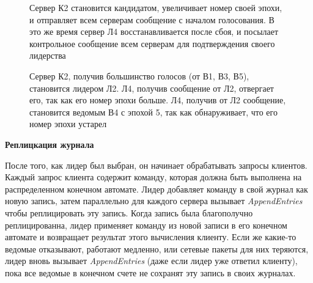 \documentclass[subf, href, colorlinks=true, 14pt,
times, mtpro, specialist]{disser}
\theoremstyle{definition}
\begin{document}
\begin{figure}[H]
\begin{minipage}[h]{0.46\linewidth}
\begin{small}
Сервер К2 становится кандидатом, увеличивает номер своей эпохи, и отправляет всем серверам сообщение с началом голосования. В это же время сервер Л4 восстанавливается после сбоя, и посылает контрольное сообщение всем серверам для подтверждения своего лидерства \\
\end{small}
\end{minipage}
\hfill
\begin{minipage}[h]{0.46\linewidth}
\begin{small}
Сервер К2, получив большинство голосов (от В1, В3, В5), становится лидером Л2. Л4, получив сообщение от Л2, отвергает его, так как его номер эпохи больше. Л4, получив от Л2 сообщение,
становится ведомым В4 с эпохой 5, так как обнаруживает, что его номер эпохи устарел \\
\end{small}
\end{minipage}
\caption{}
\label{fig:elec}
\end{figure}

\textbf{Реплицкация журнала}

После того, как лидер был выбран, он начинает обрабатывать запросы клиентов. Каждый запрос клиента содержит команду, которая должна быть выполнена на распределенном конечном автомате. Лидер добавляет команду в свой журнал как новую запись, затем параллельно для каждого сервера вызывает \textit{AppendEntries} чтобы реплицировать эту запись. Когда запись была благополучно реплицированна, лидер применяет команду из новой записи в его конечном автомате и возвращает результат этого вычисления клиенту. Если же какие-то ведомые отказывают, работают медленно, или сетевые пакеты для них теряются, лидер вновь вызывает \textit{AppendEntries} (даже если лидер уже ответил клиенту), пока все ведомые в конечном счете не сохранят эту запись в своих журналах.
\end{document}
